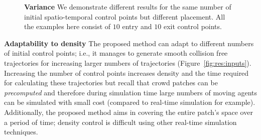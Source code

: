 \begin{figure}[t]
\begin{subfigure}[b]{0.24\linewidth}
 	\caption{}
 \end{subfigure}
 \caption{
 	\textbf{Variance}
 	We demonstrate different results for the same number of initial spatio-temporal control points but different placement.
 	All the examples here consist of $10$ entry and $10$ exit control points.
 }
 \label{fig:res:adapt-cp-placement}
\end{figure}



\textbf{Adaptability to density}
The proposed method can adapt to different numbers of initial control points; i.e., it manages to generate smooth collision free trajectories for increasing larger numbers of trajectories (Figure~\ref{fig:res:inputs}).
Increasing the number of control points increases density and the time required for calculating these trajectories but recall that crowd patches can be \emph{precomputed} and therefore during simulation time large numbers of moving agents can be simulated with small cost (compared to real-time simulation for example).
Additionally, the proposed method aims in covering the entire patch's space over a period of time;
density control is difficult using other real-time simulation techniques.



